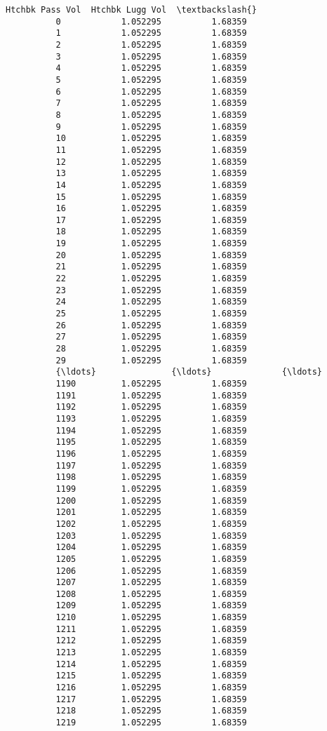 \documentclass[11pt]{article}
\begin{document}
\begin{Verbatim}[commandchars=\\\{\}]
                Htchbk Pass Vol  Htchbk Lugg Vol  \textbackslash{}
          0            1.052295          1.68359   
          1            1.052295          1.68359   
          2            1.052295          1.68359   
          3            1.052295          1.68359   
          4            1.052295          1.68359   
          5            1.052295          1.68359   
          6            1.052295          1.68359   
          7            1.052295          1.68359   
          8            1.052295          1.68359   
          9            1.052295          1.68359   
          10           1.052295          1.68359   
          11           1.052295          1.68359   
          12           1.052295          1.68359   
          13           1.052295          1.68359   
          14           1.052295          1.68359   
          15           1.052295          1.68359   
          16           1.052295          1.68359   
          17           1.052295          1.68359   
          18           1.052295          1.68359   
          19           1.052295          1.68359   
          20           1.052295          1.68359   
          21           1.052295          1.68359   
          22           1.052295          1.68359   
          23           1.052295          1.68359   
          24           1.052295          1.68359   
          25           1.052295          1.68359   
          26           1.052295          1.68359   
          27           1.052295          1.68359   
          28           1.052295          1.68359   
          29           1.052295          1.68359   
          {\ldots}               {\ldots}              {\ldots}   
          1190         1.052295          1.68359   
          1191         1.052295          1.68359   
          1192         1.052295          1.68359   
          1193         1.052295          1.68359   
          1194         1.052295          1.68359   
          1195         1.052295          1.68359   
          1196         1.052295          1.68359   
          1197         1.052295          1.68359   
          1198         1.052295          1.68359   
          1199         1.052295          1.68359   
          1200         1.052295          1.68359   
          1201         1.052295          1.68359   
          1202         1.052295          1.68359   
          1203         1.052295          1.68359   
          1204         1.052295          1.68359   
          1205         1.052295          1.68359   
          1206         1.052295          1.68359   
          1207         1.052295          1.68359   
          1208         1.052295          1.68359   
          1209         1.052295          1.68359   
          1210         1.052295          1.68359   
          1211         1.052295          1.68359   
          1212         1.052295          1.68359   
          1213         1.052295          1.68359   
          1214         1.052295          1.68359   
          1215         1.052295          1.68359   
          1216         1.052295          1.68359   
          1217         1.052295          1.68359   
          1218         1.052295          1.68359   
          1219         1.052295          1.68359   
          

\end{Verbatim}
\end{document}
